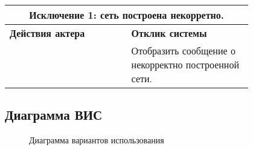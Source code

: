 			\vskip20pt
			\begin{center}
				\begin{tabular}[t]{|p{0.4\linewidth}|p{0.4\linewidth}|}
					\hline
					\multicolumn{2}{|c|}{\textbf{Исключение 1:} сеть построена некорретно.}\\
					\hline
					\textbf{Действия актера} 
						& \textbf{Отклик системы} \\ 
					\hline
						& Отобразить сообщение о некорректно построенной сети. \\ 
					\hline
				\end{tabular}
			\end{center}
			
		\begin{landscape}
		\subsection{Диаграмма ВИС}
			\begin{figure}[h!]
				\caption{Диаграмма вариантов использования}
				\label{uml}
			\end{figure}
		\end{landscape}
	